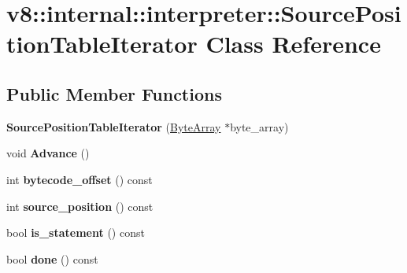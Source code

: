 \hypertarget{classv8_1_1internal_1_1interpreter_1_1_source_position_table_iterator}{}\section{v8\+:\+:internal\+:\+:interpreter\+:\+:Source\+Position\+Table\+Iterator Class Reference}
\label{classv8_1_1internal_1_1interpreter_1_1_source_position_table_iterator}
\subsection*{Public Member Functions}
\begin{DoxyCompactItemize}
\item 
{\bfseries Source\+Position\+Table\+Iterator} (\hyperlink{classv8_1_1internal_1_1_byte_array}{Byte\+Array} $\ast$byte\+\_\+array)\hypertarget{classv8_1_1internal_1_1interpreter_1_1_source_position_table_iterator_ae3688de390713f5644f61ecb8d8dafd8}{}\label{classv8_1_1internal_1_1interpreter_1_1_source_position_table_iterator_ae3688de390713f5644f61ecb8d8dafd8}

\item 
void {\bfseries Advance} ()\hypertarget{classv8_1_1internal_1_1interpreter_1_1_source_position_table_iterator_a73d06878b603121b7e705a0a18de2f51}{}\label{classv8_1_1internal_1_1interpreter_1_1_source_position_table_iterator_a73d06878b603121b7e705a0a18de2f51}

\item 
int {\bfseries bytecode\+\_\+offset} () const \hypertarget{classv8_1_1internal_1_1interpreter_1_1_source_position_table_iterator_aa8c63bd14b74307b87995016021d164d}{}\label{classv8_1_1internal_1_1interpreter_1_1_source_position_table_iterator_aa8c63bd14b74307b87995016021d164d}

\item 
int {\bfseries source\+\_\+position} () const \hypertarget{classv8_1_1internal_1_1interpreter_1_1_source_position_table_iterator_a63434920630f7283d6c09667636d8210}{}\label{classv8_1_1internal_1_1interpreter_1_1_source_position_table_iterator_a63434920630f7283d6c09667636d8210}

\item 
bool {\bfseries is\+\_\+statement} () const \hypertarget{classv8_1_1internal_1_1interpreter_1_1_source_position_table_iterator_a40644208d663d18f27ec5fc5ae2e148f}{}\label{classv8_1_1internal_1_1interpreter_1_1_source_position_table_iterator_a40644208d663d18f27ec5fc5ae2e148f}

\item 
bool {\bfseries done} () const \hypertarget{classv8_1_1internal_1_1interpreter_1_1_source_position_table_iterator_a4416e7de7f67a32261eeb6b259f53693}{}\label{classv8_1_1internal_1_1interpreter_1_1_source_position_table_iterator_a4416e7de7f67a32261eeb6b259f53693}

\end{DoxyCompactItemize}

